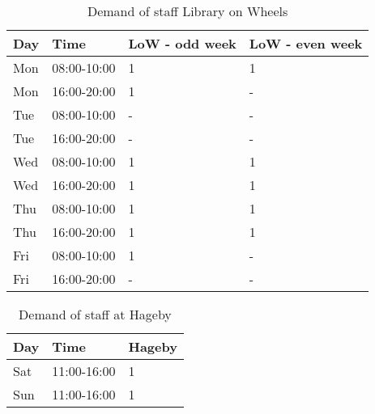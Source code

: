 \begin{table}[!h]
\centering
\caption{Demand of staff  Library on Wheels}
\label{tab:LOW_Demand}
\begin{tabularx}{0.85\textwidth}{|l|l|l|X|}
\hline
\textbf{Day} & \textbf{Time} & \textbf{LoW - odd week} & \textbf{LoW - even week} 
\\ \hline 
\rowcolor{Gray} 
Mon & 08:00-10:00 & 1 & 1
\\ \hline 
\rowcolor{Gray}  
Mon & 16:00-20:00 & 1 & -
\\ \hline 
Tue & 08:00-10:00 & - & -
\\ \hline 
Tue & 16:00-20:00 & - & -
\\ \hline 
\rowcolor{Gray} 
Wed & 08:00-10:00 & 1 & 1
\\ \hline 
\rowcolor{Gray} 
Wed & 16:00-20:00 & 1 & 1
\\ \hline 
Thu & 08:00-10:00 & 1 & 1
\\ \hline 
Thu & 16:00-20:00 & 1 & 1
\\ \hline 
\rowcolor{Gray}
Fri & 08:00-10:00 & 1 & -
\\ \hline 
\rowcolor{Gray}
Fri & 16:00-20:00 & - & -
\\ \hline 
\end{tabularx}
\end{table} 

\begin{table}[!h]
\centering
\caption{Demand of staff at Hageby}
\label{tab:Hageby_Demand}
\begin{tabularx}{0.5\textwidth}{|l|l|X|}
\hline
\textbf{Day} & \textbf{Time} & \textbf{Hageby}
\\ \hline 
Sat & 11:00-16:00  & 1 
\\ \hline 
Sun & 11:00-16:00  & 1 
\\ \hline 
\end{tabularx}
\end{table} 

